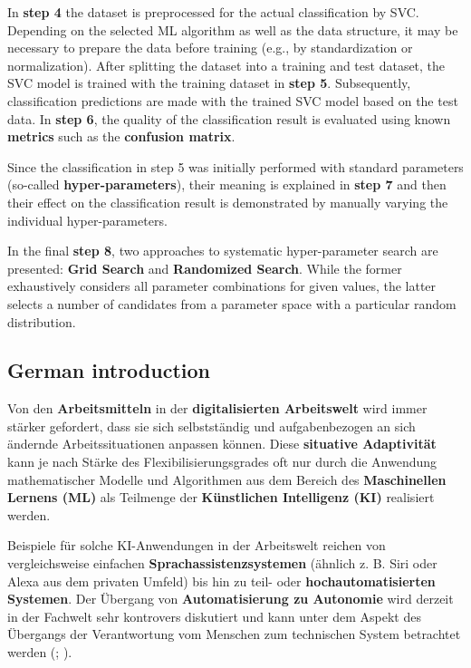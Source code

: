 \documentclass [oneside,10pt,a4paper,ngerman,BCOR10mm,headsepline,parindent,final]{scrartcl}
\begin{document}
In \textbf{step 4} the dataset is preprocessed for the actual
classification by SVC. Depending on the selected ML algorithm as well as
the data structure, it may be necessary to prepare the data before
training (e.g., by standardization or normalization). After splitting
the dataset into a training and test dataset, the SVC model is trained
with the training dataset in \textbf{step 5}. Subsequently,
classification predictions are made with the trained SVC model based on
the test data. In \textbf{step 6}, the quality of the classification
result is evaluated using known \textbf{metrics} such as the
\textbf{confusion matrix}.

Since the classification in step 5 was initially performed with standard
parameters (so-called \textbf{hyper-parameters}), their meaning is
explained in \textbf{step 7} and then their effect on the classification
result is demonstrated by manually varying the individual
hyper-parameters.

In the final \textbf{step 8}, two approaches to systematic
hyper-parameter search are presented: \textbf{Grid Search} and
\textbf{Randomized Search}. While the former exhaustively considers all
parameter combinations for given values, the latter selects a number of
candidates from a parameter space with a particular random distribution.

    \hypertarget{german-introduction}{%
\subsection{German introduction}\label{german-introduction}}

Von den \textbf{Arbeitsmitteln} in der \textbf{digitalisierten
Arbeitswelt} wird immer stärker gefordert, dass sie sich selbstständig
und aufgabenbezogen an sich ändernde Arbeitssituationen anpassen können.
Diese \textbf{situative Adaptivität} kann je nach Stärke des
Flexibilisierungsgrades oft nur durch die Anwendung mathematischer
Modelle und Algorithmen aus dem Bereich des \textbf{Maschinellen Lernens
(ML)} als Teilmenge der \textbf{Künstlichen Intelligenz (KI)} realisiert
werden.

Beispiele für solche KI-Anwendungen in der Arbeitswelt reichen von
vergleichsweise einfachen \textbf{Sprachassistenzsystemen} (ähnlich z.
B. Siri oder Alexa aus dem privaten Umfeld) bis hin zu teil- oder
\textbf{hochautomatisierten Systemen}. Der Übergang von
\textbf{Automatisierung zu Autonomie} wird derzeit in der Fachwelt sehr
kontrovers diskutiert und kann unter dem Aspekt des Übergangs der
Verantwortung vom Menschen zum technischen System betrachtet werden
(\cite{Adler_2021}; \cite{Adler_2019}).
\end{document}
